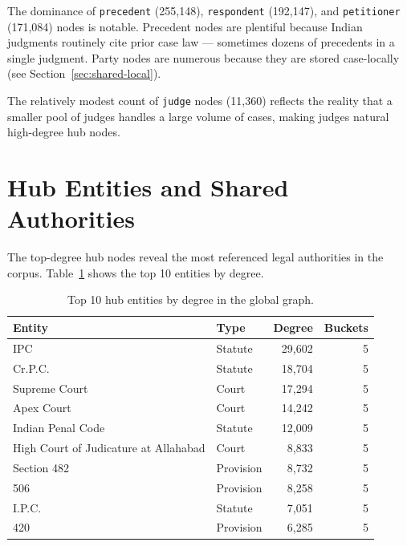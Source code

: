 The dominance of \texttt{precedent} (255,148), \texttt{respondent} (192,147), and \texttt{petitioner} (171,084) nodes is notable. Precedent nodes are plentiful because Indian judgments routinely cite prior case law — sometimes dozens of precedents in a single judgment. Party nodes are numerous because they are stored case-locally (see Section~\ref{sec:shared-local}).

The relatively modest count of \texttt{judge} nodes (11,360) reflects the reality that a smaller pool of judges handles a large volume of cases, making judges natural high-degree hub nodes.

\section{Hub Entities and Shared Authorities}
\label{sec:hubs}

The top-degree hub nodes reveal the most referenced legal authorities in the corpus. Table~\ref{tab:top-hubs} shows the top 10 entities by degree.

\begin{table}[H]
\centering
\caption{Top 10 hub entities by degree in the global graph.}
\label{tab:top-hubs}
\begin{tabular}{@{}llrr@{}}
\toprule
\textbf{Entity} & \textbf{Type} & \textbf{Degree} & \textbf{Buckets} \\
\midrule
IPC                               & Statute   & 29,602 & 5 \\
Cr.P.C.                           & Statute   & 18,704 & 5 \\
Supreme Court                     & Court     & 17,294 & 5 \\
Apex Court                        & Court     & 14,242 & 5 \\
Indian Penal Code                 & Statute   & 12,009 & 5 \\
High Court of Judicature at Allahabad & Court & 8,833  & 5 \\
Section 482                       & Provision & 8,732  & 5 \\
506                               & Provision & 8,258  & 5 \\
I.P.C.                            & Statute   & 7,051  & 5 \\
420                               & Provision & 6,285  & 5 \\
\bottomrule
\end{tabular}
\end{table}

